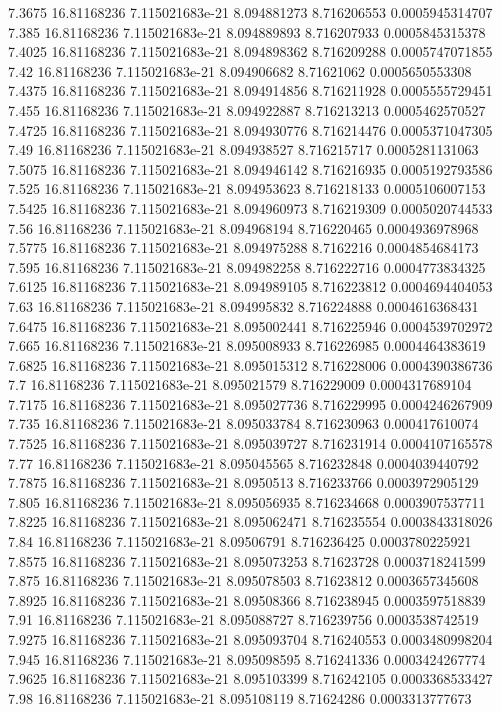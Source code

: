 {7.3675 16.81168236 7.115021683e-21 8.094881273 8.716206553 0.0005945314707
7.385 16.81168236 7.115021683e-21 8.094889893 8.716207933 0.0005845315378
7.4025 16.81168236 7.115021683e-21 8.094898362 8.716209288 0.0005747071855
7.42 16.81168236 7.115021683e-21 8.094906682 8.71621062 0.0005650553308
7.4375 16.81168236 7.115021683e-21 8.094914856 8.716211928 0.0005555729451
7.455 16.81168236 7.115021683e-21 8.094922887 8.716213213 0.0005462570527
7.4725 16.81168236 7.115021683e-21 8.094930776 8.716214476 0.0005371047305
7.49 16.81168236 7.115021683e-21 8.094938527 8.716215717 0.0005281131063
7.5075 16.81168236 7.115021683e-21 8.094946142 8.716216935 0.0005192793586
7.525 16.81168236 7.115021683e-21 8.094953623 8.716218133 0.0005106007153
7.5425 16.81168236 7.115021683e-21 8.094960973 8.716219309 0.0005020744533
7.56 16.81168236 7.115021683e-21 8.094968194 8.716220465 0.0004936978968
7.5775 16.81168236 7.115021683e-21 8.094975288 8.7162216 0.0004854684173
7.595 16.81168236 7.115021683e-21 8.094982258 8.716222716 0.0004773834325
7.6125 16.81168236 7.115021683e-21 8.094989105 8.716223812 0.0004694404053
7.63 16.81168236 7.115021683e-21 8.094995832 8.716224888 0.0004616368431
7.6475 16.81168236 7.115021683e-21 8.095002441 8.716225946 0.0004539702972
7.665 16.81168236 7.115021683e-21 8.095008933 8.716226985 0.0004464383619
7.6825 16.81168236 7.115021683e-21 8.095015312 8.716228006 0.0004390386736
7.7 16.81168236 7.115021683e-21 8.095021579 8.716229009 0.0004317689104
7.7175 16.81168236 7.115021683e-21 8.095027736 8.716229995 0.0004246267909
7.735 16.81168236 7.115021683e-21 8.095033784 8.716230963 0.000417610074
7.7525 16.81168236 7.115021683e-21 8.095039727 8.716231914 0.0004107165578
7.77 16.81168236 7.115021683e-21 8.095045565 8.716232848 0.0004039440792
7.7875 16.81168236 7.115021683e-21 8.0950513 8.716233766 0.0003972905129
7.805 16.81168236 7.115021683e-21 8.095056935 8.716234668 0.0003907537711
7.8225 16.81168236 7.115021683e-21 8.095062471 8.716235554 0.0003843318026
7.84 16.81168236 7.115021683e-21 8.09506791 8.716236425 0.0003780225921
7.8575 16.81168236 7.115021683e-21 8.095073253 8.71623728 0.0003718241599
7.875 16.81168236 7.115021683e-21 8.095078503 8.71623812 0.0003657345608
7.8925 16.81168236 7.115021683e-21 8.09508366 8.716238945 0.0003597518839
7.91 16.81168236 7.115021683e-21 8.095088727 8.716239756 0.0003538742519
7.9275 16.81168236 7.115021683e-21 8.095093704 8.716240553 0.0003480998204
7.945 16.81168236 7.115021683e-21 8.095098595 8.716241336 0.0003424267774
7.9625 16.81168236 7.115021683e-21 8.095103399 8.716242105 0.0003368533427
7.98 16.81168236 7.115021683e-21 8.095108119 8.71624286 0.0003313777673
}
